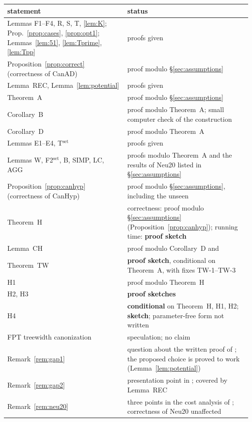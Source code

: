 \documentclass[11pt]{article}
\theoremstyle{plain}
\theoremstyle{definition}
\theoremstyle{remark}
\theoremstyle{named}
\theoremstyle{namedrm}
\begin{document}
\begin{center}\small
\begin{tabularx}{\linewidth}{@{}L{4.6cm}Y@{}}
\toprule
statement & status\\
\midrule
Lemmas F1--F4, R, S, T, \ref{lem:K}; Prop.~\ref{prop:cases}, \ref{prop:opt1}; Lemmas~\ref{lem:51}, \ref{lem:Tprime}, \ref{lem:Tpp} & proofs given\\
Proposition~\ref{prop:correct} (correctness of CanAD) & proof modulo \S\ref{sec:assumptions}\\
Lemma~REC, Lemma~\ref{lem:potential} & proofs given\\
Theorem~A & proof modulo \S\ref{sec:assumptions}\\
Corollary~B & proof modulo Theorem~A; small computer check of the construction\\
Corollary~D & proof modulo Theorem~A\\
Lemmas E1--E4, T$^{\text{set}}$ & proofs given\\
Lemmas W, F2$^{\text{set}}$, B, SIMP, LC, AGG & proofs modulo Theorem~A and the results of Neu20 listed in \S\ref{sec:assumptions}\\
Proposition~\ref{prop:canhyp} (correctness of CanHyp) & proof modulo \S\ref{sec:assumptions}, including the unseen \cite[Lemma~6.1.17]{Neu19}\\
Theorem~H & correctness: proof modulo \S\ref{sec:assumptions} (Proposition~\ref{prop:canhyp}); running time: \textbf{proof sketch}\\
Lemma~CH & proof modulo Corollary~D and \cite[Lemma~23]{GNSW}\\
Theorem~TW & \textbf{proof sketch}, conditional on Theorem~A, with fixes TW-1--TW-3\\
H1 & proof modulo Theorem~H\\
H2, H3 & \textbf{proof sketches}\\
H4 & \textbf{conditional} on Theorem~H, H1, H2; \textbf{sketch}; parameter-free form not written\\
FPT treewidth canonization & speculation; no claim\\
Remark~\ref{rem:gap1} & question about the written proof of \cite[Lemma~7.2]{GNS}; the proposed choice is proved to work (Lemma~\ref{lem:potential})\\
Remark~\ref{rem:gap2} & presentation point in \cite[Thm.~7.3]{GNS}; covered by Lemma~REC\\
Remark~\ref{rem:neu20} & three points in the cost analysis of \cite{Neu20}; correctness of Neu20 unaffected\\
\bottomrule
\end{tabularx}
\end{center}
\end{document}
